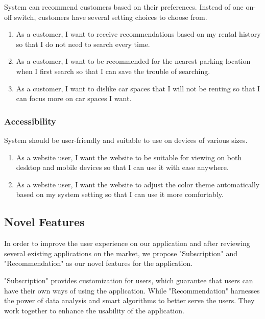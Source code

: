 \documentclass[12pt]{article}
\begin{document}
System can recommend customers based on their preferences. Instead of one on-off switch, customers have several setting choices to choose from.

\begin{enumerate}[resume]
  \item As a customer, I want to receive recommendations based on my rental history so that I do not need to search every time.
  \item As a customer, I want to be recommended for the nearest parking location when I first search so that I can save the trouble of searching.
  \item As a customer, I want to dislike car spaces that I will not be renting so that I can focus more on car spaces I want.
\end{enumerate}

\subsubsection{Accessibility}

System should be user-friendly and suitable to use on devices of various sizes.

\begin{enumerate}[resume]
  \item As a website user, I want the website to be suitable for viewing on both desktop and mobile devices so that I can use it with ease anywhere.
  \item As a website user, I want the website to adjust the color theme automatically based on my system setting so that I can use it more comfortably.
\end{enumerate}

\subsection{Novel Features}

In order to improve the user experience on our application and after reviewing several existing applications on the market, we propose "Subscription" and "Recommendation" as our novel features for the application.

"Subscription" provides customization for users, which guarantee that users can have their own ways of using the application. While "Recommendation" harnesses the power of data analysis and smart algorithms to better serve the users. They work together to enhance the usability of the application.
\end{document}
